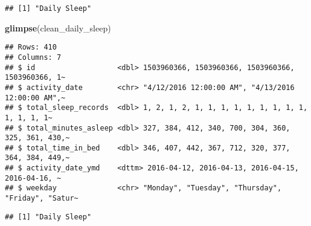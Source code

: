 \documentclass[
]{article}
\newenvironment{Shaded}{\begin{snugshade}}{\end{snugshade}}
\newcommand{\FunctionTok}[1]{\textcolor[rgb]{0.13,0.29,0.53}{\textbf{#1}}}
\newcommand{\NormalTok}[1]{#1}
\newcommand{\OtherTok}[1]{\textcolor[rgb]{0.56,0.35,0.01}{#1}}
\newcommand{\SpecialCharTok}[1]{\textcolor[rgb]{0.81,0.36,0.00}{\textbf{#1}}}
\newcommand{\StringTok}[1]{\textcolor[rgb]{0.31,0.60,0.02}{#1}}
\begin{document}
\begin{Shaded}
\end{Shaded}

\begin{verbatim}
## [1] "Daily Sleep"
\end{verbatim}

\begin{Shaded}
\begin{Highlighting}[]
\FunctionTok{glimpse}\NormalTok{(clean\_daily\_sleep)}
\end{Highlighting}
\end{Shaded}

\begin{verbatim}
## Rows: 410
## Columns: 7
## $ id                   <dbl> 1503960366, 1503960366, 1503960366, 1503960366, 1~
## $ activity_date        <chr> "4/12/2016 12:00:00 AM", "4/13/2016 12:00:00 AM",~
## $ total_sleep_records  <dbl> 1, 2, 1, 2, 1, 1, 1, 1, 1, 1, 1, 1, 1, 1, 1, 1, 1~
## $ total_minutes_asleep <dbl> 327, 384, 412, 340, 700, 304, 360, 325, 361, 430,~
## $ total_time_in_bed    <dbl> 346, 407, 442, 367, 712, 320, 377, 364, 384, 449,~
## $ activity_date_ymd    <dttm> 2016-04-12, 2016-04-13, 2016-04-15, 2016-04-16, ~
## $ weekday              <chr> "Monday", "Tuesday", "Thursday", "Friday", "Satur~
\end{verbatim}

\begin{Shaded}
\end{Shaded}

\begin{verbatim}
## [1] "Daily Sleep"
\end{verbatim}
\end{document}
